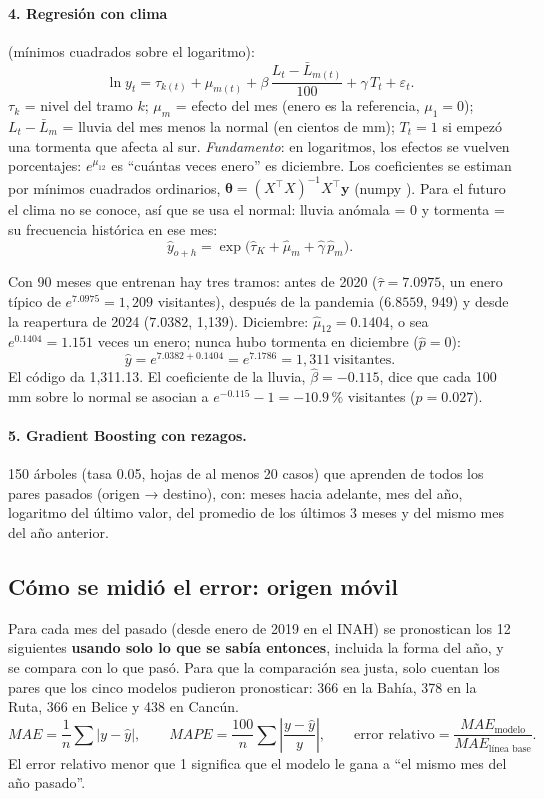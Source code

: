 \paragraph{4. Regresión con clima} (mínimos cuadrados sobre el logaritmo):
\[
\ln y_t=\tau_{k(t)}+\mu_{m(t)}+\beta\,\frac{L_t-\bar L_{m(t)}}{100}+\gamma\,T_t+\varepsilon_t .
\]
$\tau_k$ = nivel del tramo $k$; $\mu_m$ = efecto del mes (enero es la referencia, $\mu_1=0$); $L_t-\bar L_m$ = lluvia del mes
menos la normal (en cientos de mm); $T_t=1$ si empezó una tormenta que afecta al sur.
\emph{Fundamento}: en logaritmos, los efectos se vuelven porcentajes: $e^{\mu_{12}}$ es ``cuántas veces enero'' es
diciembre. Los coeficientes se estiman por mínimos cuadrados ordinarios, $\hat{\bm\theta}=(X^\top X)^{-1}X^\top\bm y$
(numpy ). Para el futuro el clima no se conoce, así que se usa el normal: lluvia anómala = 0 y tormenta =
su frecuencia histórica en ese mes:
\[
\hat y_{o+h}=\exp\big(\hat\tau_K+\hat\mu_m+\hat\gamma\,\hat p_m\big).
\]

\begin{amano}
Con 90 meses que entrenan hay tres tramos: antes de 2020 ($\hat\tau=7.0975$, un enero típico de $e^{7.0975}=1{,}209$
visitantes), después de la pandemia ($6.8559$, 949) y desde la reapertura de 2024 ($7.0382$, 1,139). Diciembre:
$\hat\mu_{12}=0.1404$, o sea $e^{0.1404}=1.151$ veces un enero; nunca hubo tormenta en diciembre ($\hat p=0$):
\[
\hat y=e^{7.0382+0.1404}=e^{7.1786}=1{,}311\ \text{visitantes}.
\]
El código da 1,311.13. El coeficiente de la lluvia, $\hat\beta=-0.115$, dice que cada 100 mm sobre lo normal se asocian a
$e^{-0.115}-1=-10.9\,\%$ visitantes ($p=0.027$).
\end{amano}

\paragraph{5. Gradient Boosting con rezagos.} 150 árboles (tasa 0.05, hojas de al menos 20 casos) que aprenden de todos
los pares pasados (origen → destino), con: meses hacia adelante, mes del año, logaritmo del último valor, del promedio de
los últimos 3 meses y del mismo mes del año anterior.

\subsection{Cómo se midió el error: origen móvil}
Para cada mes del pasado (desde enero de 2019 en el INAH) se pronostican los 12 siguientes \textbf{usando solo lo que se
sabía entonces}, incluida la forma del año, y se compara con lo que pasó. Para que la comparación sea justa, solo cuentan
los pares que los cinco modelos pudieron pronosticar: 366 en la Bahía, 378 en la Ruta, 366 en Belice y 438 en Cancún.
\[
MAE=\frac1n\sum|y-\hat y|,\qquad MAPE=\frac{100}{n}\sum\left|\frac{y-\hat y}{y}\right|,\qquad
\text{error relativo}=\frac{MAE_{\text{modelo}}}{MAE_{\text{línea base}}} .
\]
El error relativo menor que 1 significa que el modelo le gana a ``el mismo mes del año pasado''.

